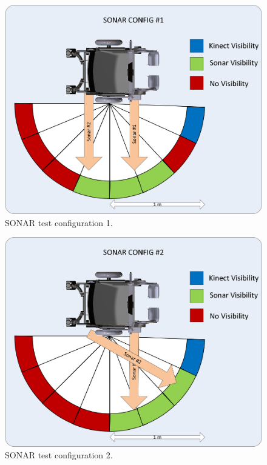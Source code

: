 \documentclass[oneside,final]{report}
\begin{document}
\begin{figure}[hbt]
 \centering
 \includegraphics[scale=0.6]{SONAR_Config1.png}
 \caption{SONAR test configuration 1.}
 \label{sonar_1}
\end{figure}

\begin{figure}[hbt]
 \centering
 \includegraphics[scale=0.6]{SONAR_Config2.png}
 \caption{SONAR test configuration 2.}
 \label{sonar_2}
\end{figure}
\end{document}
